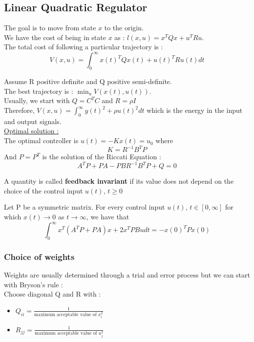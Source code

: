 \documentclass[../main.tex]{subfiles}
\begin{document}
\subsection{Linear Quadratic Regulator}
The goal is to move from state $x$ to the origin.\\
We have the cost of being in state $x$ as : $l(x,u) = x^TQx + u^TRu$.\\

The total cost of following a particular trajectory is : \begin{equation}
    V(x,u) = \int_0^\infty x(t)^TQx(t) + u(t)^TRu(t)dt
\end{equation}

Assume R positive definite and Q positive semi-definite.\\

The best trajectory is : $\min_u V(x(t),u(t))$.\\

Usually, we start with $Q = C^TC$ and $R=  \rho I$\\
Therefore, $V(x,u) = \int_0^\infty y(t)^2 + \rho u(t)^2dt$ which is the energy in the input and output signals.\\

\quad \underline{Optimal solution :}\\
The optimal controller is $u(t) = -Kx(t) = u_0$ where \begin{equation}
    K = R^{-1} B^TP
\end{equation}
And $P = P^T$ is the solution of the Riccati Equation : \begin{equation}
    A^TP + PA-PBR^{-1}B^TP + Q = 0
\end{equation}

A quantity is called \textbf{feedback invariant} if its value does not depend on the choice of the control input $u(t)$, $t\geq 0$\\
\begin{theorem}
    Let P be a symmetric matrix. For every control input $u(t)$, $t\in [0,\infty]$ for which $x(t)\rightarrow 0$ as $t\rightarrow \infty$, we have that \begin{equation}
        \int_0^\infty x^T(A^TP+PA)x+2x^TPBudt = -x(0)^TPx(0)
    \end{equation}
\end{theorem}

\subsubsection{Choice of weights}
Weights are usually determined through a trial and error process but we can start with Bryson's rule : \\
Choose diagonal Q and R with :
\begin{itemize}
    \item $Q_{ii} = \frac{1}{\text{maximum acceptable value of }x_i^2}$\\
    \item $R_{jj} = \frac{1}{\text{maximum acceptable value of }u_j^2}$\\
\end{itemize}
\end{document}
